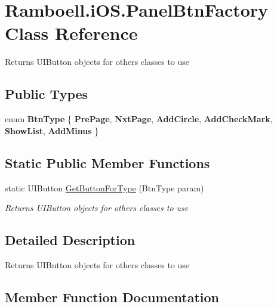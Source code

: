 \hypertarget{class_ramboell_1_1i_o_s_1_1_panel_btn_factory}{}\section{Ramboell.\+i\+O\+S.\+Panel\+Btn\+Factory Class Reference}
\label{class_ramboell_1_1i_o_s_1_1_panel_btn_factory}


Returns U\+I\+Button objects for others classes to use  


\subsection*{Public Types}
\begin{DoxyCompactItemize}
\item 
\mbox{\label{class_ramboell_1_1i_o_s_1_1_panel_btn_factory_a8f133a5fbbf4c069707345ac6fe411e6}} 
enum {\bfseries Btn\+Type} \{ \newline
{\bfseries Pre\+Page}, 
{\bfseries Nxt\+Page}, 
{\bfseries Add\+Circle}, 
{\bfseries Add\+Check\+Mark}, 
\newline
{\bfseries Show\+List}, 
{\bfseries Add\+Minus}
 \}
\end{DoxyCompactItemize}
\subsection*{Static Public Member Functions}
\begin{DoxyCompactItemize}
\item 
static U\+I\+Button \hyperlink{class_ramboell_1_1i_o_s_1_1_panel_btn_factory_a316b40da92c98e8096b49f332626e611}{Get\+Button\+For\+Type} (Btn\+Type param)
\begin{DoxyCompactList}\small\item\em Returns U\+I\+Button objects for others classes to use \end{DoxyCompactList}\end{DoxyCompactItemize}


\subsection{Detailed Description}
Returns U\+I\+Button objects for others classes to use 



\subsection{Member Function Documentation}
\mbox{\label{class_ramboell_1_1i_o_s_1_1_panel_btn_factory_a316b40da92c98e8096b49f332626e611}} 
